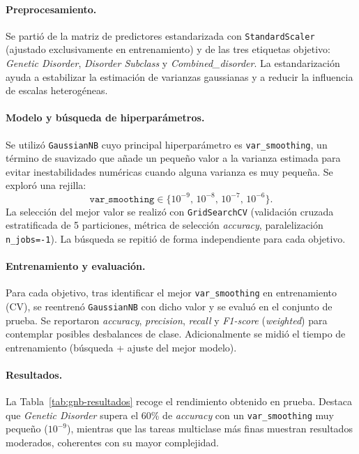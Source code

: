 \documentclass[11pt,a4paper,spanish]{book}
\numberwithin{equation}{chapter}
\numberwithin{figure}{chapter}
\begin{document}
\paragraph{Preprocesamiento.}
Se partió de la matriz de predictores estandarizada con \texttt{StandardScaler} (ajustado
exclusivamente en entrenamiento) y de las tres etiquetas objetivo:
\textit{Genetic Disorder}, \textit{Disorder Subclass} y \textit{Combined\_disorder}.
La estandarización ayuda a estabilizar la estimación de varianzas gaussianas y a reducir
la influencia de escalas heterogéneas.

\paragraph{Modelo y búsqueda de hiperparámetros.}
Se utilizó \texttt{GaussianNB} cuyo principal hiperparámetro es \texttt{var\_smoothing},
un término de suavizado que añade un pequeño valor a la varianza estimada para evitar
inestabilidades numéricas cuando alguna varianza es muy pequeña.
Se exploró una rejilla:
\[
\texttt{var\_smoothing} \in \{10^{-9},\,10^{-8},\,10^{-7},\,10^{-6}\}.
\]
La selección del mejor valor se realizó con \texttt{GridSearchCV} (validación cruzada
estratificada de 5 particiones, métrica de selección \textit{accuracy}, paralelización
\texttt{n\_jobs=-1}). La búsqueda se repitió de forma independiente para cada objetivo.

\paragraph{Entrenamiento y evaluación.}
Para cada objetivo, tras identificar el mejor \texttt{var\_smoothing} en entrenamiento (CV),
se reentrenó \texttt{GaussianNB} con dicho valor y se evaluó en el conjunto de prueba.
Se reportaron \textit{accuracy}, \textit{precision}, \textit{recall} y \textit{F1-score}
(\textit{weighted}) para contemplar posibles desbalances de clase.
Adicionalmente se midió el tiempo de entrenamiento (búsqueda + ajuste del mejor modelo).

\paragraph{Resultados.}
La Tabla~\ref{tab:gnb-resultados} recoge el rendimiento obtenido en prueba. Destaca que
\textit{Genetic Disorder} supera el 60\% de \textit{accuracy} con un \texttt{var\_smoothing}
muy pequeño ($10^{-9}$), mientras que las tareas multiclase más finas muestran resultados
moderados, coherentes con su mayor complejidad.
\end{document}
